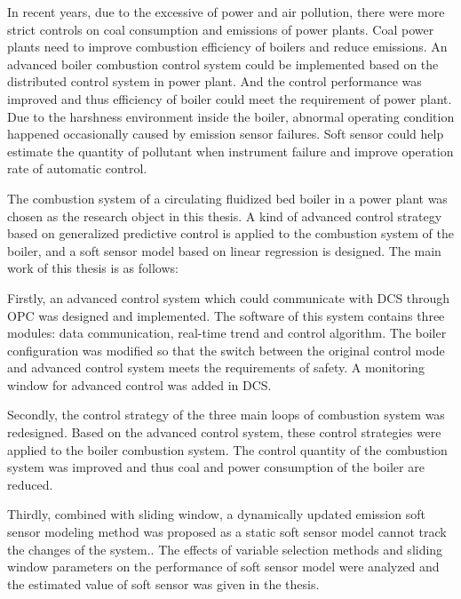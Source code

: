 \begin{enabstract}
In recent years, due to the excessive of power and air pollution, there were more strict controls on coal consumption and emissions of power plants. Coal power plants need to improve combustion efficiency of boilers and reduce emissions. An advanced boiler combustion control system could be implemented based on the distributed control system in power plant. And the control performance was improved and thus efficiency of boiler could meet the requirement of power plant. Due to the harshness environment inside the boiler, abnormal operating condition happened occasionally caused by emission sensor failures. Soft sensor could help estimate the quantity of pollutant when instrument failure and improve operation rate of automatic control.

The combustion system of a circulating fluidized bed boiler in a power plant was chosen as the research object in this thesis. A kind of advanced control strategy based on generalized predictive control is applied to the combustion system of the boiler, and a  soft sensor model based on linear regression is designed. The main work of this thesis is as follows:

Firstly, an advanced control system which could communicate with DCS through OPC was designed and implemented. The software of this system contains three modules: data communication, real-time trend and control algorithm. The boiler configuration was modified so that the switch between the original control mode and advanced control system meets the requirements of safety. A monitoring window for advanced control was added in DCS.

Secondly, the control strategy of the three main loops of combustion system was redesigned. Based on the advanced control system, these control strategies were applied to the boiler combustion system. The control quantity of the combustion system was improved and thus coal and power consumption of the boiler are reduced.

Thirdly, combined with sliding window, a dynamically updated  emission soft sensor modeling method was proposed as a static soft sensor model cannot track the changes of the system.. The effects of variable selection methods and sliding window parameters on the performance of soft sensor model were analyzed and the estimated value of soft sensor was given in the thesis. 

\end{enabstract}
